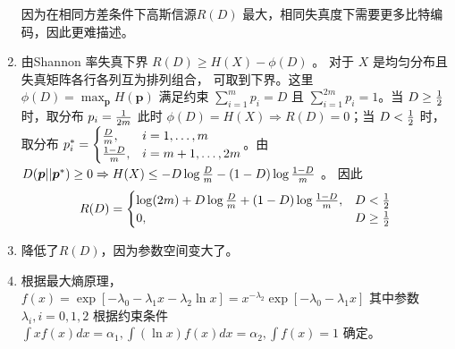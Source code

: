 \documentclass{article}
\begin{document}
\begin{enumerate}
因为在相同方差条件下高斯信源$R(D)$ 最大，相同失真度下需要更多比特编码，因此更难描述。
\item
由Shannon 率失真下界 $ R(D) \geq H(X) - \phi(D) $ 。 对于 $ X$ 是均匀分布且失真矩阵各行各列互为排列组合，
可取到下界。这里 $\phi(D) = \max_{\bm{p}} H(\bm{p}) $ 满足约束 $ \sum_{ i = 1 }^m p_i = D $
且 $ \sum_{ i = 1}^{2m} p_i = 1 $。当 $ D \geq {1 \over 2}$ 时，取分布 $ p_i = {1 \over 2m} $ 此时
$ \phi(D) = H(X) \Rightarrow R(D) = 0 $；当 $ D < { 1 \over 2} $ 时， 取分布
$ p^*_i = \begin{cases} {D \over m}, & i=1, \dots, m\\
{1-D \over m}, & i=m+1, \dots, 2m 
\end{cases}
$。由 $D(\bm{p} || \bm{p}^*) \geq 0 \Rightarrow H(X) \leq -D \log { D \over m} - (1-D) \log {1-D \over m} $ 。
因此
$$
R(D) = \begin{cases} \log(2m) + D \log { D \over m} + (1-D) \log {1-D \over m}, & D <{1 \over 2}\\
0, & D \geq { 1 \over 2} \end{cases}
$$
\item 
降低了$R(D)$，因为参数空间变大了。
\item
根据最大熵原理， 
$f(x) = \exp[-\lambda_0 - \lambda_1 x -\lambda_2 \ln x] = x^{-\lambda_2} \exp[-\lambda_0 - \lambda_1 x]
$
其中参数$\lambda_i, i=0,1,2$ 根据约束条件 $\int xf(x) dx = \alpha_1, \int (\ln x) f(x) dx = \alpha_2, \int f(x) = 1 $ 确定。
\end{enumerate}
\end{document}
